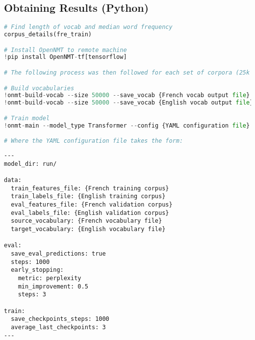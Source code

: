 \documentclass[11pt]{article}
\begin{document}
\subsection{Obtaining Results (Python)}

\begin{lstlisting}[language=Python]
# Find length of vocab and median word frequency
corpus_details(fre_train)

# Install OpenNMT to remote machine
!pip install OpenNMT-tf[tensorflow]

# The following process was then followed for each set of corpora (25k to 800k training sizes; baseline, manual, bpe, and morfessor)

# Build vocabularies
!onmt-build-vocab --size 50000 --save_vocab {French vocab output file} {French training corpus}
!onmt-build-vocab --size 50000 --save_vocab {English vocab output file} {English training corpus}

# Train model
!onmt-main --model_type Transformer --config {YAML configuration file} --auto_config train --with_eval

# Where the YAML configuration file takes the form:
\end{lstlisting}
\begin{verbatim}
---
model_dir: run/

data:
  train_features_file: {French training corpus}
  train_labels_file: {English training corpus}
  eval_features_file: {French validation corpus}
  eval_labels_file: {English validation corpus}
  source_vocabulary: {French vocabulary file}
  target_vocabulary: {English vocabulary file}

eval:
  save_eval_predictions: true
  steps: 1000
  early_stopping:
    metric: perplexity
    min_improvement: 0.5
    steps: 3

train:
  save_checkpoints_steps: 1000
  average_last_checkpoints: 3
---
\end{verbatim}
\end{document}
